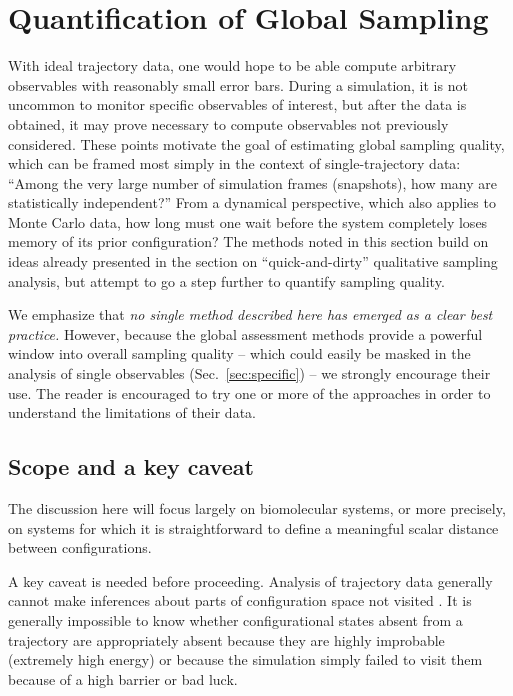 \section{Quantification of Global Sampling}
\label{sec:global}

With ideal trajectory data, one would hope to be able compute arbitrary observables with reasonably small error bars.
During a simulation, it is not uncommon to monitor specific observables of interest, but after the data is obtained, it may prove necessary to compute observables not previously considered.
These points motivate the goal of estimating global sampling quality, which can be framed most simply in the context of single-trajectory data:
``Among the very large number of simulation frames (snapshots), how many are statistically independent?''
From a dynamical perspective, which also applies to Monte Carlo data, how long must one wait before the system completely loses memory of its prior configuration?
The methods noted in this section build on ideas already presented in the section on ``quick-and-dirty'' qualitative sampling analysis, but attempt to go a step further to quantify sampling quality.

We emphasize that \emph{no single method described here has emerged as a clear best practice.}
However, because the global assessment methods provide a powerful window into overall sampling quality -- which could easily be masked in the analysis of single observables (Sec.\ \ref{sec:specific}) -- we strongly encourage their use.
The reader is encouraged to try one or more of the approaches in order to understand the limitations of their data.

\subsection{Scope and a key caveat}
The discussion here will focus largely on biomolecular systems, or more precisely, on systems for which it is straightforward to define a meaningful scalar distance between configurations.

A key caveat is needed before proceeding.
Analysis of trajectory data generally cannot make inferences about parts of configuration space not visited \cite{Grossfield2009}.
It is generally impossible to know whether configurational states absent from a trajectory are appropriately absent because they are highly improbable (extremely high energy) or because the simulation simply failed to visit them because of a high barrier or bad luck.

